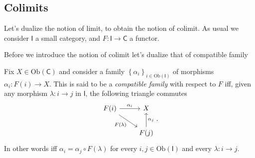 \subsection{Colimits}
Let's dualize the notion of limit, to obtain the notion of colimit.
As usual we consider $\mathsf{I}$ a small category, and $F\colon \mathsf{I} \to \mathsf{C}$ a functor.

Before we introduce the notion of colimit let's dualize that of compatible family
\begin{defn}
	Fix $X \in \mathrm{Ob} \left(\mathsf{C}\right)$ and
	consider a family $\left\{ \alpha_i \right\}_{i \in \mathrm{Ob} \left(\mathsf{I}\right)}$ of morphisms $\alpha_i\colon F(i) \to X$.
	This is said to be a {\em compatible family} with respect to $F$ iff, given any morphism $\lambda\colon i \to j$ in $\mathsf{I}$,
	the following triangle commutes
	\begin{equation}
	\begin{tikzcd}
		F(i) \arrow[r, "\alpha_i", rightarrow] \arrow[rd, "F(\lambda)"', rightarrow] &
		X \\
		&
		F(j) \arrow[u, "\alpha_j"', rightarrow] 
	\end{tikzcd}
	.\end{equation} 
	In other words iff $\alpha_i = \alpha_j \circ F(\lambda)$ for every $i, j \in \mathrm{Ob} \left(\mathsf{I}\right)$ and every $\lambda\colon i \to j$.
\end{defn}

